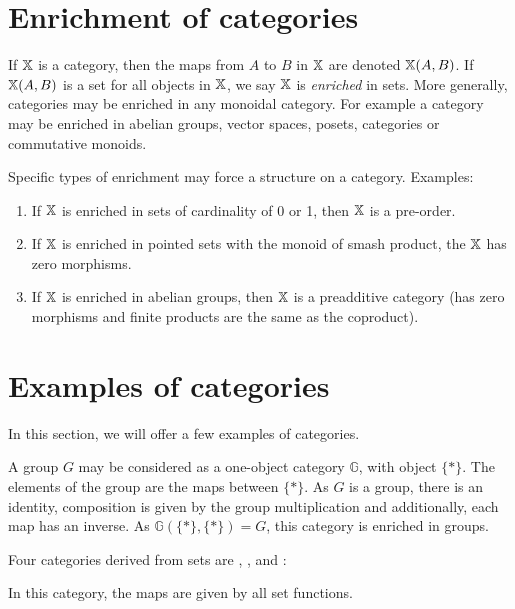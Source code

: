 \section{Enrichment of categories} %
\label{sub:enrichement_of_categories}
\begin{notation}\label{notn:hom-set}
  If $\mathbb{X}$ is a category, then the maps from $A$ to $B$ in $\mathbb{X}$ are denoted $\mathbb{X}(A,B)$.
  If $\mathbb{X}(A,B)$ is a set for all objects in $\mathbb{X}$, we say $\mathbb{X}$ is \emph{enriched} in sets. More generally,
  categories may be enriched in any monoidal category. For example a category may be
  enriched in abelian groups, vector spaces, posets, categories or commutative monoids.
\end{notation}

Specific types of enrichment may force a structure on a category. Examples:
\begin{enumerate}
 \item If $\mathbb{X}$ is enriched in sets of cardinality of 0 or 1, then $\mathbb{X}$ is a pre-order.
 \item If $\mathbb{X}$ is enriched in pointed sets with the monoid of smash product, the $\mathbb{X}$ has zero morphisms.
 \item If $\mathbb{X}$ is enriched in abelian groups, then $\mathbb{X}$ is a preadditive category (has zero
   morphisms and finite products are the same as the coproduct).
\end{enumerate}

\section{Examples of categories} %
\label{sub:examples_of_categories}
In this section, we will offer a few examples of categories.

\begin{example}
  A group $G$ may be considered as a one-object category $\mathbb{G}$, with object $\{*\}$. The elements of the
  group are the maps between $\{*\}$. As $G$ is a group, there is an identity, composition is given
  by the group multiplication and additionally, each map has an inverse. As $\mathbb{G}(\{*\},\{*\})
  = G$, this category is enriched in groups.
\end{example}

Four categories derived from sets are \sets, \Par, \rel and \pinj:

\begin{example}[\sets]\label{ex:category_sets}
In this category, the maps are given by all set functions.
\end{example}

